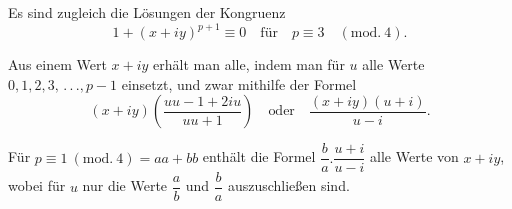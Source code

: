 Es sind zugleich die Lösungen der Kongruenz
\[
1+(x+iy)^{p+1}\equiv0\quad\text{für}\quad p\equiv3\quad(\mathrm{mod.}\ 4).
\]
\par\indent Aus einem Wert $x+iy$ erhält man alle, indem man für $u$ alle Werte\\
$0,1,2,3,\, .\, .\, .,p-1$ einsetzt, und zwar mithilfe der Formel
\[
(x+iy)\left(\frac{uu-1+2iu}{uu+1}\right)\quad\text{oder}\quad\frac{(x+iy)(u+i)}{u-i}.
\]
\par\indent Für $p\equiv1\ (\mathrm{mod.}\ 4)=aa+bb$ enthält die Formel $\dfrac{b}{a}.\dfrac{u+i}{u-i}$ alle Werte von $x+iy$, wobei für $u$ nur die Werte $\dfrac{a}{b}$ und $\dfrac{b}{a}$ auszuschließen sind.
